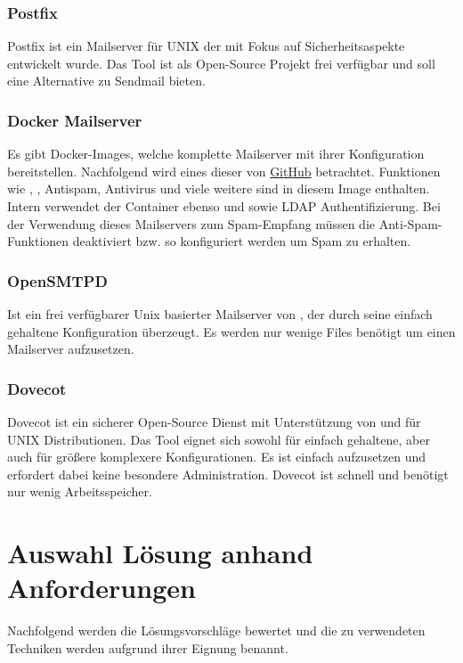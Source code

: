 \documentclass[a4paper,11pt,singlespacing]{article}
\begin{document}
		\subsubsection{Postfix}\label{sec:Postfix}
			Postfix ist ein Mailserver für UNIX der mit Fokus auf Sicherheitsaspekte entwickelt wurde.
			Das Tool ist als Open-Source Projekt frei verfügbar und soll eine Alternative zu Sendmail bieten.
			\cite{postfix}

		\subsubsection{Docker Mailserver}\label{sec:FullstackDockerMailserver}
			Es gibt Docker-Images, welche komplette Mailserver mit ihrer Konfiguration bereitstellen.
			Nachfolgend wird eines dieser von \href{https://github.com/tomav/docker-mailserver}{GitHub} betrachtet.
			Funktionen wie , , Antispam, Antivirus und viele weitere sind in diesem Image enthalten.
			Intern verwendet der Container ebenso  und  sowie LDAP Authentifizierung.
			Bei der Verwendung dieses Mailservers zum Spam-Empfang müssen die Anti-Spam-Funktionen deaktiviert bzw. so konfiguriert werden um Spam zu erhalten.

		\subsubsection{OpenSMTPD}\label{sec:OpenSMTPD}
			Ist ein frei verfügbarer Unix basierter Mailserver von , der durch seine einfach gehaltene Konfiguration überzeugt.
			Es werden nur wenige Files benötigt um einen Mailserver aufzusetzen.
			\cite{openSMTPD}

		\subsubsection{Dovecot}\label{sec:Dovecot}
			Dovecot ist ein sicherer Open-Source Dienst mit Unterstützung von  und  für UNIX Distributionen.
			Das Tool eignet sich sowohl für einfach gehaltene, aber auch für grö{\ss}ere komplexere Konfigurationen.
			Es ist einfach aufzusetzen und erfordert dabei keine besondere Administration.
			Dovecot ist schnell und benötigt nur wenig Arbeitsspeicher. \cite{dovecot}

\newpage


\section{Auswahl Lösung anhand Anforderungen}\label{sec:AuswahlLösungAnhandAnforderungen}
	Nachfolgend werden die Lösungsvorschläge bewertet und die zu verwendeten Techniken werden aufgrund ihrer Eignung benannt.
\end{document}
